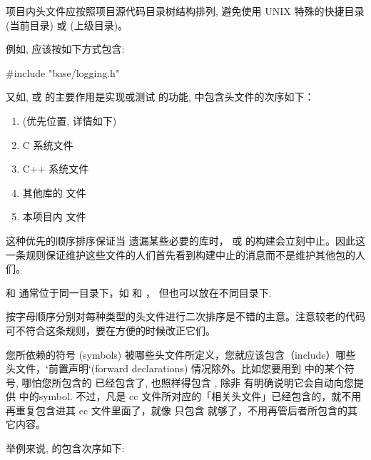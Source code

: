 
项目内头文件应按照项目源代码目录树结构排列, 避免使用 UNIX 特殊的快捷目录  (当前目录) 或  (上级目录)。

例如,  应该按如下方式包含:

\begin{cppcode}
	#include "base/logging.h"
\end{cppcode}

又如,  或  的主要作用是实现或测试 的功能,  中包含头文件的次序如下：

\begin{enumerate}
	\item {} (优先位置, 详情如下)
	\item C 系统文件
	\item C++ 系统文件
	\item 其他库的  文件
	\item 本项目内  文件
\end{enumerate}

这种优先的顺序排序保证当  遗漏某些必要的库时，  或  的构建会立刻中止。因此这一条规则保证维护这些文件的人们首先看到构建中止的消息而不是维护其他包的人们。

 和  通常位于同一目录下，如 和 ， 但也可以放在不同目录下.

按字母顺序分别对每种类型的头文件进行二次排序是不错的主意。注意较老的代码可不符合这条规则，要在方便的时候改正它们。

您所依赖的符号 (symbols) 被哪些头文件所定义，您就应该包含（include）哪些头文件，`前置声明`(forward declarations) 情况除外。比如您要用到  中的某个符号, 哪怕您所包含的  已经包含了, 也照样得包含 , 除非  有明确说明它会自动向您提供  中的symbol. 不过，凡是 cc 文件所对应的「相关头文件」已经包含的，就不用再重复包含进其 cc 文件里面了，就像 只包含  就够了，不用再管后者所包含的其它内容。

举例来说,  的包含次序如下:

